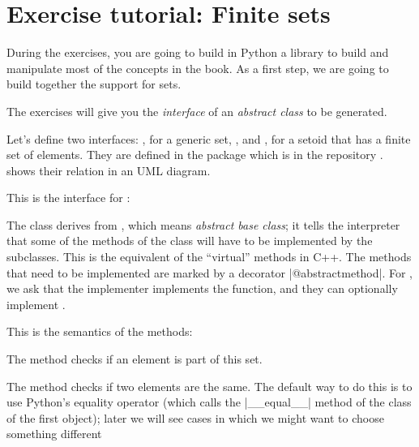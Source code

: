 

\section{Exercise tutorial: Finite sets}\label{sec:exercise-tutorial}


During the exercises, you are going to build in Python a library to build and manipulate most of the concepts in the book.
As a first step, we are going to build together the support for sets.

The exercises will give you the \emph{interface} of an \emph{abstract class} to be generated.

Let's define two interfaces: , for a generic set, , and , for a setoid that has a finite set of elements.
They are defined in the package  which is in the repository .
 shows their relation in an UML diagram.

\begin{marginfigure}

  \caption{}
  \label{fig:Setoid-inheritance}
\end{marginfigure}

This is the interface for :

\begin{widepar}
\end{widepar}

The class   derives from , which means \emph{abstract base class}; it tells the interpreter that some of the methods of the class will have to be implemented by the subclasses.
This is the equivalent of the ``virtual'' methods in C++.
The methods that need to be implemented are marked by a decorator \pystr|@abstractmethod|.
For , we ask that the implementer implements the  function, and they can optionally implement .

This is the semantics of the methods:

\begin{compactitem}
  \item The method  checks if an element is part of this set.
  \item The method  checks if two elements are the same. The default way to do this is to use Python's equality operator (which calls the \pystr|__equal__| method of the class of the first object); later we will see cases in which we might want to choose something different
\end{compactitem}


